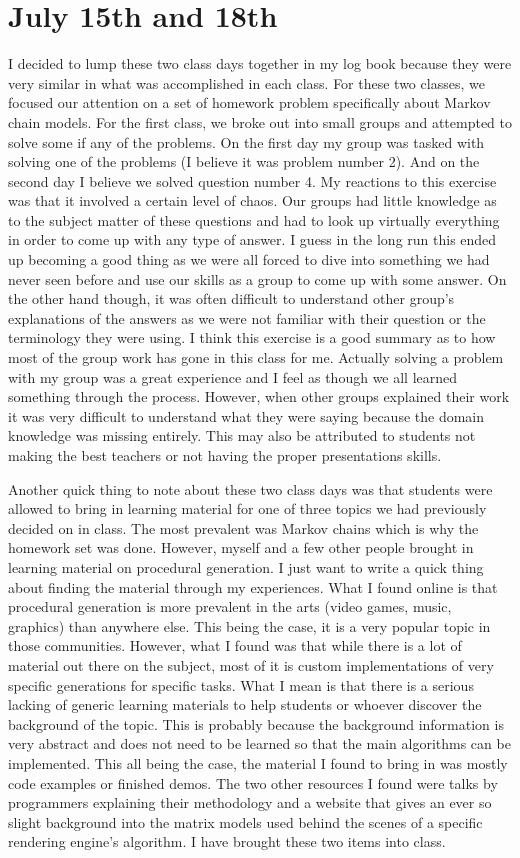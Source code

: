 \documentclass[conference]{IEEEtran}
\begin{document}
\section{July 15th and 18th}
I decided to lump these two class days together in my log book because they were very similar in what was accomplished
in each class. For these two classes, we focused our attention on a set of homework problem specifically about Markov
chain models. For the first class, we broke out into small groups and attempted to solve some if any of the problems.
On the first day my group was tasked with solving one of the problems (I believe it was problem number 2). And on
the second day I believe we solved question number 4. My reactions to this exercise was that it involved a certain
level of chaos. Our groups had little knowledge as to the subject matter of these questions and had to look up
virtually everything in order to come up with any type of answer. I guess in the long run this ended up becoming a 
good thing as we were all forced to dive into something we had never seen before and use our skills as a group to
come up with some answer. On the other hand though, it was often difficult to understand other group's explanations
of the answers as we were not familiar with their question or the terminology they were using. I think this exercise
is a good summary as to how most of the group work has gone in this class for me. Actually solving a problem with my
group was a great experience and I feel as though we all learned something through the process. However, when other
groups explained their work it was very difficult to understand what they were saying because the domain knowledge
was missing entirely. This may also be attributed to students not making the best teachers or not having the proper
presentations skills. 

Another quick thing to note about these two class days was that students were allowed to bring in learning material
for one of three topics we had previously decided on in class. The most prevalent was Markov chains which is why the
homework set was done. However, myself and a few other people brought in learning material on procedural generation.
I just want to write a quick thing about finding the material through my experiences. What I found online is that
procedural generation is more prevalent in the arts (video games, music, graphics) than anywhere else. This being
the case, it is a very popular topic in those communities. However, what I found was that while there is a lot of
material out there on the subject, most of it is custom implementations of very specific generations for specific
tasks. What I mean is that there is a serious lacking of generic learning materials to help students or whoever
discover the background of the topic. This is probably because the background information is very abstract and
does not need to be learned so that the main algorithms can be implemented. This all being the case, the material I
found to bring in was mostly code examples or finished demos. The two other resources I found were talks by
programmers explaining their methodology and a website that gives an ever so slight background into the matrix models
used behind the scenes of a specific rendering engine's algorithm. I have brought these two items into class.
\end{document}
